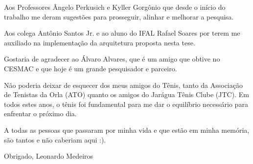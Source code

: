 Aos Professores Ângelo Perkusich e Kyller Gorgônio que desde o início do trabalho me deram sugestões para prosseguir, alinhar e melhorar a pesquisa.

Aos colega Antônio Santos Jr. e ao aluno do IFAL Rafael Soares por terem me auxiliado na implementação da arquitetura proposta nesta tese.

Gostaria de agradecer ao Álvaro Alvares, que é um amigo que obtive no CESMAC e que hoje é um grande pesquisador e parceiro.

Não poderia deixar de esquecer dos meus amigos do Tênis, tanto da Associação de Tenistas da Orla (ATO) quanto os amigos do Jarágua Tênis Clube (JTC). Em todos estes anos, o tênis foi fundamental para me dar o equilíbrio necessário para enfrentar o próximo dia. 

A todas as pessoas que passaram por minha vida e que estão em minha memória, são tantos e não caberiam aqui :).

Obrigado, \linebreak
Leonardo Medeiros



